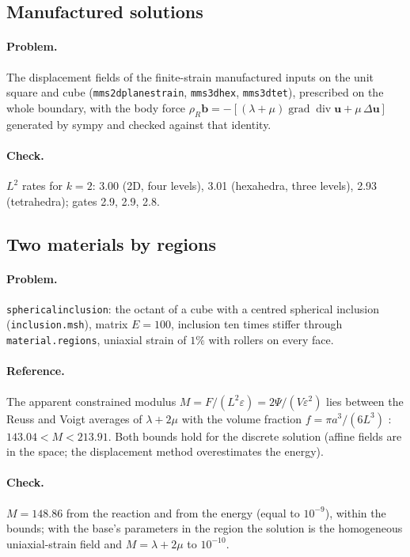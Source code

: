 \documentclass[11pt]{article}
\newcommand{\grad}{\operatorname{grad}}
\newcommand{\dive}{\operatorname{div}}
\newcommand{\bu}{\bm{u}}
\newcommand{\bb}{\bm{b}}
\DeclareRobustCommand{\code}[1]{{\def\_{\textunderscore\allowbreak}\texttt{#1}}}
\DeclareRobustCommand{\file}[1]{{\def\_{\textunderscore\allowbreak}\texttt{#1}}}
\begin{document}
\subsection{Manufactured solutions}

\paragraph{Problem.}
The displacement fields of the finite-strain manufactured inputs on the
unit square and cube (\file{mms\_2d\_plane\_strain}, \file{mms\_3d\_hex},
\file{mms\_3d\_tet}), prescribed on the whole boundary, with the body force
$\rho_R\bb = -[(\lambda + \mu)\grad\dive\bu + \mu\,\Delta\bu]$ generated by
sympy and checked against that identity.

\paragraph{Check.}
$L^2$ rates for $k = 2$: 3.00 (2D, four levels), 3.01 (hexahedra, three
levels), 2.93 (tetrahedra); gates 2.9, 2.9, 2.8.

\subsection{Two materials by regions}

\paragraph{Problem.}
\file{spherical\_inclusion}: the octant of a cube with a centred spherical
inclusion (\file{inclusion.msh}), matrix $E = 100$, inclusion ten times
stiffer through \code{material.regions}, uniaxial strain of $1\%$ with
rollers on every face.

\paragraph{Reference.}
The apparent constrained modulus $M = F/(L^2\varepsilon) = 2\Psi/(V\varepsilon^2)$
lies between the Reuss and Voigt averages of $\lambda + 2\mu$ with the
volume fraction $f = \pi a^3/(6L^3)$ \cite{hill}: $143.04 < M < 213.91$.
Both bounds hold for the discrete solution (affine fields are in the space;
the displacement method overestimates the energy).

\paragraph{Check.}
$M = 148.86$ from the reaction and from the energy (equal to $10^{-9}$),
within the bounds; with the base's parameters in the region the solution is
the homogeneous uniaxial-strain field and $M = \lambda + 2\mu$ to $10^{-10}$.
\end{document}
